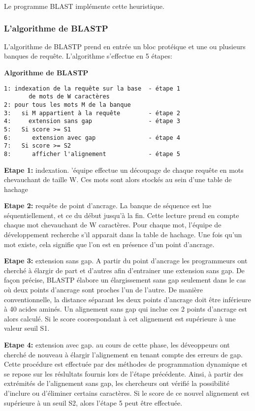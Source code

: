 Le programme BLAST implémente cette heuristique.

\subsubsection{L'algorithme de BLASTP}

L'algorithme de BLASTP prend en entrée un bloc protéique
et une ou plusieurs banques de requête. L'algorithme
s'effectue en 5 étapes:

{\bf Algorithme de BLASTP}

\begin{verbatim}
1: indexation de la requête sur la base  - étape 1
       de mots de W caractères
2: pour tous les mots M de la banque
3:   si M appartient à la requête        - étape 2
4:     extension sans gap                - étape 3
5:   Si score >= S1
6:      extension avec gap               - étape 4
7:   Si score >= S2
8:      afficher l'alignement            - étape 5
\end{verbatim}

{\bf Etape 1:} indexation.
'équipe effectue un découpage de chaque
requête en mots chevauchant de taille W. Ces mots sont
alors stockés au sein d'une table de hachage

{\bf Etape 2:} requête de point d'ancrage. La banque de
séquence est lue séquentiellement, et ce du début
jusqu'à la fin. Cette lecture prend en compte chaque
mot chevauchant de W caractères.
Pour chaque mot, l'équipe de développement
recherche s'il apparait dans la table de hachage.
Une fois qu'un mot existe, cela signifie que l'on est
en présence d'un point d'ancrage.

{\bf Etape 3:} extension sans gap. A partir du point d'ancrage
les programmeurs ont cherché à élargir de part et d'autres afin
d'entrainer une extension sans gap. De façon précise,
BLASTP élabore un élargissement sans gap seulement dans
le cas où deux points d'ancrage sont proches l'un de
l'autre. De manière conventionnelle, la distance séparant
les deux points d'ancrage doit être inférieure à 40 acides
aminés. Un alignement sans gap qui inclue ces 2 points
d'ancrage est alors calculé. Si le score coorespondant
à cet alignement est supérieure à une valeur seuil S1.

{\bf Etape 4:} extension avec gap. au cours de cette phase,
les déveoppeurs ont cherché de nouveau à élargir l'alignement en tenant
compte des erreurs de gap. Cette procédure est effectuée
par des méthodes de programmation dynamique et se repose
sur les réslultats fournis lors de l'étape précédente.
Ainsi, à partir des extrémités de l'alignement sans gap, les chercheurs
ont vérifié la possibilité d'inclure ou d'éliminer certains
caractères. Si le score de ce nouvel alignement est
supérieure à un seuil S2, alors l'étape 5 peut être
effectuée.

